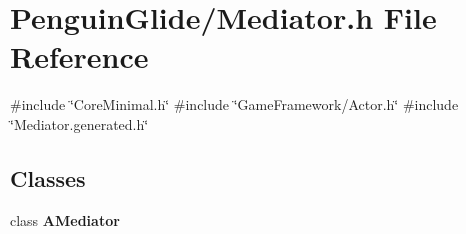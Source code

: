 \section{Penguin\+Glide/\+Mediator.h File Reference}
\label{_mediator_8h}
{\ttfamily \#include \char`\"{}Core\+Minimal.\+h\char`\"{}}\newline
{\ttfamily \#include \char`\"{}Game\+Framework/\+Actor.\+h\char`\"{}}\newline
{\ttfamily \#include \char`\"{}Mediator.\+generated.\+h\char`\"{}}\newline
\subsection*{Classes}
\begin{DoxyCompactItemize}
\item 
class \textbf{ A\+Mediator}
\end{DoxyCompactItemize}
